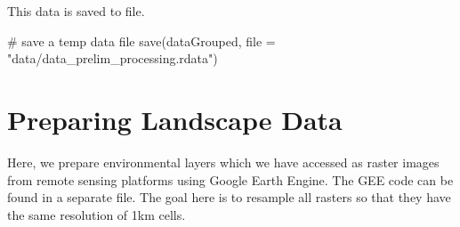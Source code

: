 \documentclass[]{article}
\newenvironment{Shaded}{}{}
\newcommand{\CommentTok}[1]{\textcolor[rgb]{0.00,0.50,0.00}{#1}}
\newcommand{\ControlFlowTok}[1]{\textcolor[rgb]{0.00,0.00,1.00}{#1}}
\newcommand{\DataTypeTok}[1]{#1}
\newcommand{\DecValTok}[1]{#1}
\newcommand{\KeywordTok}[1]{\textcolor[rgb]{0.00,0.00,1.00}{#1}}
\newcommand{\NormalTok}[1]{#1}
\newcommand{\OperatorTok}[1]{#1}
\newcommand{\OtherTok}[1]{\textcolor[rgb]{1.00,0.25,0.00}{#1}}
\newcommand{\StringTok}[1]{\textcolor[rgb]{0.00,0.50,0.50}{#1}}
\begin{document}
\begin{Shaded}
\end{Shaded}

This data is saved to file.

\begin{Shaded}
\begin{Highlighting}[]

\CommentTok{# save a temp data file}
\KeywordTok{save}\NormalTok{(dataGrouped, }\DataTypeTok{file =} \StringTok{"data/data_prelim_processing.rdata"}\NormalTok{)}
\end{Highlighting}
\end{Shaded}

\hypertarget{preparing-landscape-data}{%
\section{Preparing Landscape Data}\label{preparing-landscape-data}}

Here, we prepare environmental layers which we have accessed as raster images from remote sensing platforms using Google Earth Engine.
The GEE code can be found in a separate file.
The goal here is to resample all rasters so that they have the same resolution of 1km cells.
\end{document}
